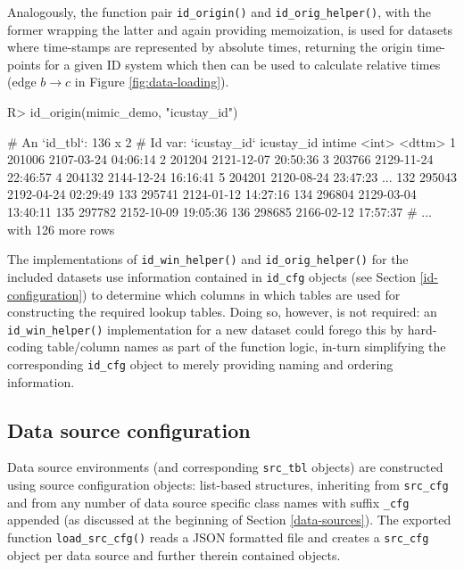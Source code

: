 \documentclass[
  notitle]{jss}
\begin{document}
Analogously, the function pair \texttt{id\_origin()} and
\texttt{id\_orig\_helper()}, with the former wrapping the latter and
again providing memoization, is used for datasets where time-stamps are
represented by absolute times, returning the origin time-points for a
given ID system which then can be used to calculate relative times (edge
\(b \to c\) in Figure \ref{fig:data-loading}).

\begin{CodeChunk}
\begin{CodeInput}
R> id_origin(mimic_demo, "icustay_id")
\end{CodeInput}
\begin{CodeOutput}
# An `id_tbl`: 136 x 2
# Id var:      `icustay_id`
    icustay_id intime
         <int> <dttm>
  1     201006 2107-03-24 04:06:14
  2     201204 2121-12-07 20:50:36
  3     203766 2129-11-24 22:46:57
  4     204132 2144-12-24 16:16:41
  5     204201 2120-08-24 23:47:23
...
132     295043 2192-04-24 02:29:49
133     295741 2124-01-12 14:27:16
134     296804 2129-03-04 13:40:11
135     297782 2152-10-09 19:05:36
136     298685 2166-02-12 17:57:37
# ... with 126 more rows
\end{CodeOutput}
\end{CodeChunk}

The implementations of \texttt{id\_win\_helper()} and
\texttt{id\_orig\_helper()} for the included datasets use information
contained in \texttt{id\_cfg} objects (see Section
\ref{id-configuration}) to determine which columns in which tables are
used for constructing the required lookup tables. Doing so, however, is
not required: an \texttt{id\_win\_helper()} implementation for a new
dataset could forego this by hard-coding table/column names as part of
the function logic, in-turn simplifying the corresponding
\texttt{id\_cfg} object to merely providing naming and ordering
information.

\hypertarget{data-source-configuration}{%
\subsection{Data source configuration}\label{data-source-configuration}}

Data source environments (and corresponding \texttt{src\_tbl} objects)
are constructed using source configuration objects: list-based
structures, inheriting from \texttt{src\_cfg} and from any number of
data source specific class names with suffix \texttt{\_cfg} appended (as
discussed at the beginning of Section \ref{data-sources}). The exported
function \texttt{load\_src\_cfg()} reads a JSON formatted file and
creates a \texttt{src\_cfg} object per data source and further therein
contained objects.
\end{document}
